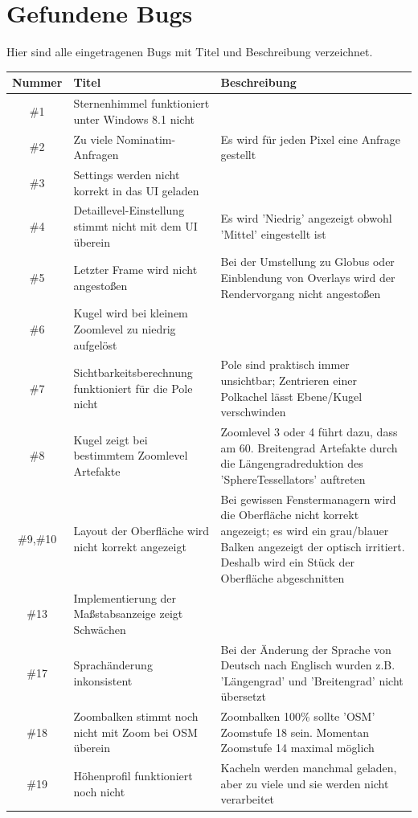 \documentclass[10pt]{scrreprt}
\begin{document}
\section{Gefundene Bugs}
Hier sind alle eingetragenen Bugs mit Titel und Beschreibung verzeichnet.
\begin{longtable}{|c|p{5.2cm}|p{8.2cm}|}
\hline
Nummer & Titel & Beschreibung \\
\hline
\hline
\#1 & Sternenhimmel funktioniert unter Windows 8.1 nicht & \\
\hline
\#2 & Zu viele Nominatim-Anfragen & Es wird für jeden Pixel eine Anfrage gestellt \\
\hline
\#3 & Settings werden nicht korrekt in das UI geladen & \\
\hline
\#4 & Detaillevel-Einstellung stimmt nicht mit dem UI überein & Es wird 'Niedrig' angezeigt
 obwohl 'Mittel' eingestellt ist \\
\hline
\#5 & Letzter Frame wird nicht angestoßen & Bei der Umstellung zu Globus oder Einblendung von Overlays wird der Rendervorgang nicht angestoßen\\
\hline
\#6 & Kugel wird bei kleinem Zoomlevel zu niedrig aufgelöst & \\
\hline
\#7 & Sichtbarkeitsberechnung funktioniert für die Pole nicht & Pole sind praktisch immer unsichtbar; Zentrieren einer Polkachel lässt Ebene/Kugel verschwinden \\
\hline
\#8 & Kugel zeigt bei bestimmtem Zoomlevel Artefakte & Zoomlevel 3 oder 4 führt dazu, dass am 60. Breitengrad Artefakte durch die Längengradreduktion des 'SphereTessellators' auftreten \\
\hline
\#9,\#10 & Layout der Oberfläche wird nicht korrekt angezeigt & Bei gewissen Fenstermanagern wird die Oberfläche nicht korrekt angezeigt; es wird ein grau/blauer Balken angezeigt der optisch irritiert. Deshalb wird ein Stück der Oberfläche abgeschnitten \\
\hline
\#13 & Implementierung der Maßstabsanzeige zeigt Schwächen & \\
\hline
\#17 & Sprachänderung inkonsistent & Bei der Änderung der Sprache von Deutsch nach Englisch wurden z.B. 'Längengrad' und 'Breitengrad' nicht übersetzt\\
\hline
\#18 & Zoombalken stimmt noch nicht mit Zoom bei OSM überein & Zoombalken 100\% sollte 'OSM' Zoomstufe 18 sein. Momentan Zoomstufe 14 maximal möglich\\
\hline
\#19 & Höhenprofil funktioniert noch nicht & Kacheln werden manchmal geladen, aber zu viele und sie werden nicht verarbeitet \\

\end{longtable}
\end{document}
